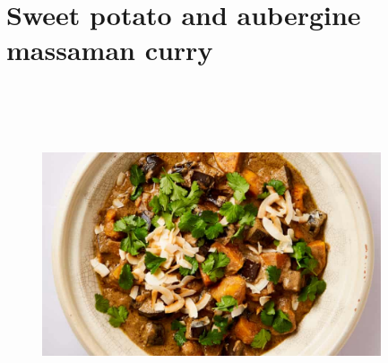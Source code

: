 \documentclass{book}
\begin{document}
\section{Sweet potato and aubergine massaman curry}
\begin{figure}
\centering\includegraphics[width=10cm,height=10cm,keepaspectratio]{Recipe_Pictures/Sweet_potato_and_aubergine_massaman_curry.png}
\end{figure}
\end{document}

